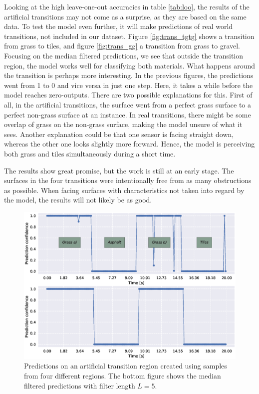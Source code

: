 Looking at the high leave-one-out accuracies in table \ref{tab:loo}, the results of the artificial transitions may not come as a surprise, as they are based on the same data. To test the model even further, it will make predictions of real world transitions, not included in our dataset. Figure \ref{fig:trans_tgtg} shows a transition from grass to tiles, and figure \ref{fig:trans_gg} a transition from grass to gravel. Focusing on the median filtered predictions, we see that outside the transition region, the model works well for classifying both materials. What happens around the transition is perhaps more interesting. In the previous figures, the predictions went from 1 to 0 and vice versa in just one step. Here, it takes a while before the model reaches zero-outputs. There are two possible explanations for this. First of all, in the artificial transitions, the surface went from a perfect grass surface to a perfect non-grass surface at an instance. In real transitions, there might be some overlap of grass on the non-grass surface, making the model unsure of what it sees. Another explanation could be that one sensor is facing straight down, whereas the other one looks slightly more forward. Hence, the model is perceiving both grass and tiles simultaneously during a short time. 

The results show great promise, but the work is still at an early stage. The surfaces in the four transitions were intentionally free from as many obstructions as possible. When facing surfaces with characteristics not taken into regard by the model, the results will not likely be as good. 

\begin{figure}
	\centering
	\includegraphics[scale=0.5]{figs_temp/varmats1}
	\caption{Predictions on an artificial transition region created using samples from four different regions. The bottom figure shows the median filtered predictions with filter length $L=5$.}
	\label{fig:artificial1}
\end{figure}

